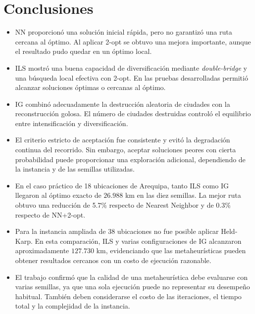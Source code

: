 \documentclass{article}
\begin{document}
\section{Conclusiones}

\begin{itemize}
    \item NN proporcionó una solución inicial rápida, pero no garantizó una ruta
    cercana al óptimo. Al aplicar 2-opt se obtuvo una mejora importante, aunque
    el resultado pudo quedar en un óptimo local.

    \item ILS mostró una buena capacidad de diversificación mediante
    \textit{double-bridge} y una búsqueda local efectiva con 2-opt. En las pruebas
    desarrolladas permitió alcanzar soluciones óptimas o cercanas al óptimo.

    \item IG combinó adecuadamente la destrucción aleatoria de ciudades con la
    reconstrucción golosa. El número de ciudades destruidas controló el equilibrio
    entre intensificación y diversificación.

    \item El criterio estricto de aceptación fue consistente y evitó la degradación
    continua del recorrido. Sin embargo, aceptar soluciones peores con cierta
    probabilidad puede proporcionar una exploración adicional, dependiendo de la
    instancia y de las semillas utilizadas.

    \item En el caso práctico de 18 ubicaciones de Arequipa, tanto ILS como IG
    llegaron al óptimo exacto de $26.988$ km en las diez semillas. La mejor ruta
    obtuvo una reducción de 5.7\% respecto de Nearest Neighbor y de 0.3\% respecto
    de NN+2-opt.

    \item Para la instancia ampliada de 38 ubicaciones no fue posible aplicar
    Held-Karp. En esta comparación, ILS y varias configuraciones de IG alcanzaron
    aproximadamente $127.730$ km, evidenciando que las metaheurísticas pueden
    obtener resultados cercanos con un costo de ejecución razonable.

    \item El trabajo confirmó que la calidad de una metaheurística debe evaluarse
    con varias semillas, ya que una sola ejecución puede no representar su desempeño
    habitual. También deben considerarse el costo de las iteraciones, el tiempo total
    y la complejidad de la instancia.
\end{itemize}
\end{document}
